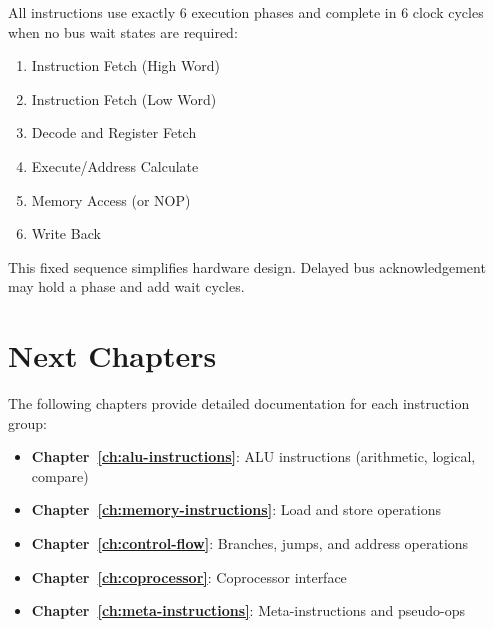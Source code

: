 All instructions use exactly 6 execution phases and complete in 6 clock cycles when no bus wait states are required:

\begin{enumerate}
	\item Instruction Fetch (High Word)
	\item Instruction Fetch (Low Word)
	\item Decode and Register Fetch
	\item Execute/Address Calculate
	\item Memory Access (or NOP)
	\item Write Back
\end{enumerate}

This fixed sequence simplifies hardware design. Delayed bus acknowledgement may hold a phase and add wait cycles.

\section{Next Chapters}

The following chapters provide detailed documentation for each instruction group:

\begin{itemize}
	\item \textbf{Chapter~\ref{ch:alu-instructions}}: ALU instructions (arithmetic, logical, compare)
	\item \textbf{Chapter~\ref{ch:memory-instructions}}: Load and store operations
	\item \textbf{Chapter~\ref{ch:control-flow}}: Branches, jumps, and address operations
	\item \textbf{Chapter~\ref{ch:coprocessor}}: Coprocessor interface
	\item \textbf{Chapter~\ref{ch:meta-instructions}}: Meta-instructions and pseudo-ops
\end{itemize}
